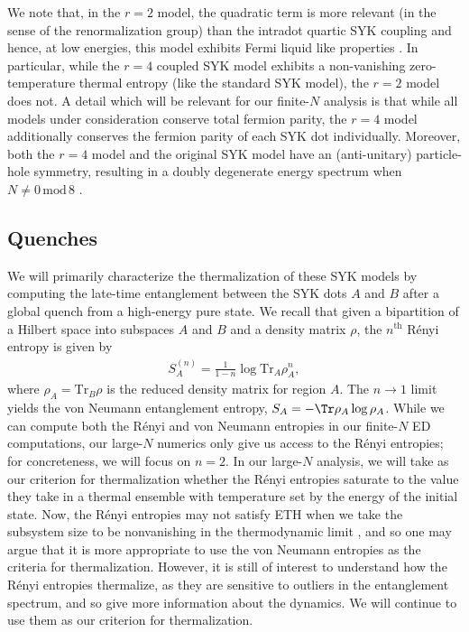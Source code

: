\documentclass[reprint, floatfix,eqsecnum,superscriptaddress,preprint,nofootinbib,onecolumn,amsmath,amssymb,aps,prb]{revtex4-2}
\begin{document}
We note that, in the $r=2$ model, the quadratic term is more relevant (in the sense of the renormalization group) than the intradot quartic SYK coupling and hence, at low energies, this model exhibits Fermi liquid like properties \cite{Chen2017}. In particular, while the $r=4$ coupled SYK model exhibits a non-vanishing zero-temperature thermal entropy (like the standard SYK model), the $r=2$ model does not. A detail which will be relevant for %
our finite-$N$ analysis is that while all models under consideration conserve total fermion parity, the $r=4$ model additionally conserves the fermion parity of each SYK dot individually. Moreover, both the $r=4$ model and the original SYK model have an (anti-unitary) particle-hole symmetry, resulting in a doubly degenerate energy spectrum when $N \neq 0 \, \text{mod} \, 8$
\cite{You2017,Cotler2017}. 

\subsection{Quenches}

We will primarily characterize the thermalization of these SYK models by computing the late-time entanglement between the SYK dots $A$ and $B$ after a global quench from a high-energy pure state. 
We recall that given a bipartition of a Hilbert space into subspaces $A$ and $B$ and a density matrix $\rho$, the $n^{\mathrm{th}}$ R\'enyi entropy is given by
\begin{align}
	S^{(n)}_A = \frac{1}{1-n} \log \mathrm{Tr}_{A} \rho^n_A,
\end{align}
where $\rho_A = \mathrm{Tr}_{B} \rho$ is the reduced density matrix for region $A$. The $n \to 1$ limit yields the von Neumann entanglement entropy,
    $S_A = - \Tr  \rho_A \log \rho_A$. 
While we can compute both the R\'enyi and von Neumann entropies in our finite-$N$ ED computations, our large-$N$ numerics only give us access to the R\'enyi entropies; for concreteness, we will focus on $n=2$. In our large-$N$ analysis, we will take as our criterion for thermalization whether the R\'enyi entropies saturate to the value they take in a thermal ensemble with temperature set by the energy of the initial state.
Now, the R\'enyi entropies may not satisfy ETH when we take the subsystem size to be nonvanishing in the thermodynamic limit \cite{Garrison2018}, and so one may argue that it is more appropriate to use the von Neumann entropies as the criteria for thermalization. However, it is still of interest to understand how the R\'enyi entropies thermalize, as they are sensitive to outliers in the entanglement spectrum, and so give more information about the dynamics. We will continue to use them as our criterion for thermalization.
\end{document}
